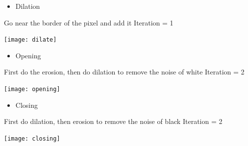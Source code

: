 \documentclass{article}
\begin{document}
    \begin{itemize}
        \item Dilation
    \end{itemize}

    Go near the border of the pixel and add it
    Iteration = 1

    \texttt{[image: dilate]}

    \begin{itemize}
        \item Opening
    \end{itemize}

    First do the erosion, then do dilation to remove the noise of white
    Iteration = 2

    \texttt{[image: opening]}

    \begin{itemize}
        \item Closing
    \end{itemize}

    First do dilation, then erosion to remove the noise of black
    Iteration = 2

    \texttt{[image: closing]}
\end{document}
